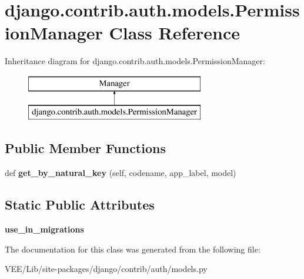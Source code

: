 \hypertarget{classdjango_1_1contrib_1_1auth_1_1models_1_1_permission_manager}{}\section{django.\+contrib.\+auth.\+models.\+Permission\+Manager Class Reference}
\label{classdjango_1_1contrib_1_1auth_1_1models_1_1_permission_manager}
Inheritance diagram for django.\+contrib.\+auth.\+models.\+Permission\+Manager\+:\begin{figure}[H]
\begin{center}
\leavevmode
\includegraphics[height=2.000000cm]{classdjango_1_1contrib_1_1auth_1_1models_1_1_permission_manager}
\end{center}
\end{figure}
\subsection*{Public Member Functions}
\begin{DoxyCompactItemize}
\item 
\mbox{\label{classdjango_1_1contrib_1_1auth_1_1models_1_1_permission_manager_a6efe7e59f2efe8e65ac6de26b2992f15}} 
def {\bfseries get\+\_\+by\+\_\+natural\+\_\+key} (self, codename, app\+\_\+label, model)
\end{DoxyCompactItemize}
\subsection*{Static Public Attributes}
\begin{DoxyCompactItemize}
\item 
\mbox{\label{classdjango_1_1contrib_1_1auth_1_1models_1_1_permission_manager_acb84adf2c2185f7a2e49435c52e7d91b}} 
{\bfseries use\+\_\+in\+\_\+migrations}
\end{DoxyCompactItemize}


The documentation for this class was generated from the following file\+:\begin{DoxyCompactItemize}
\item 
V\+E\+E/\+Lib/site-\/packages/django/contrib/auth/models.\+py\end{DoxyCompactItemize}
